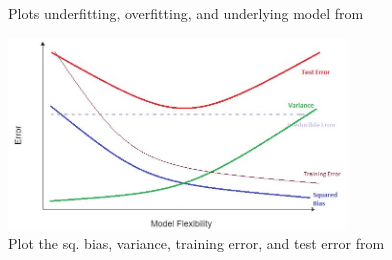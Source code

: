 \documentclass{kthreport}
\begin{document}
\begin{figure}[!h]
\begin{minipage}{.5\linewidth}
{        }
    \end{minipage}\par\medskip
    \centering
    \label{fig:main}
    \caption{Plots underfitting, overfitting, and underlying model
             from \cite{the-bias-variance-tradeoff}}
\end{figure}


\begin{figure}[!h]
    \centering
    \includegraphics[width=0.8\textwidth]{figs/bias-var-trade.jpg}
    \caption{
        Plot the sq. bias, variance, training error, and test error
        from \cite{the-bias-variance-tradeoff}
    }
    \label{fig:bias-vars-tradeoff}
\end{figure}

\pagebreak



\end{document}
